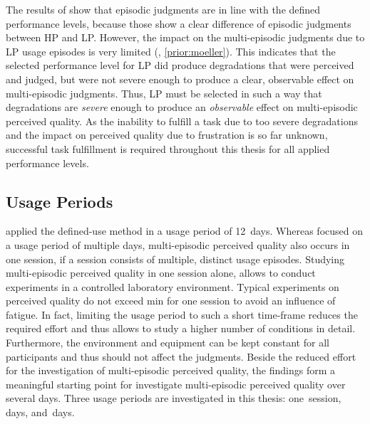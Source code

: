 The results of \citet{moller_single-call_2011} show that episodic judgments are in line with the defined performance levels, because those show a clear difference of episodic judgments between \ac{HP} and \ac{LP}.
However, the impact on the multi-episodic judgments due to \ac{LP} usage episodes is very limited (\cf, \autoref{prior:moeller}).
This indicates that the selected performance level for \ac{LP} did produce degradations that were perceived and judged, but were not severe enough to produce a clear, observable effect on multi-episodic judgments.
Thus, \ac{LP} must be selected in such a way that degradations are \emph{severe} enough to produce an \emph{observable} effect on multi-episodic perceived quality.
As the inability to fulfill a task due to too severe degradations and the impact on perceived quality due to frustration is so far unknown, successful task fulfillment is required throughout this thesis for all applied performance levels.

\subsection{Usage Periods}
\citet{moller_single-call_2011} applied the defined-use method in a usage period of 12~days. 
Whereas \citet{moller_single-call_2011} focused on a usage period of multiple days, multi-episodic perceived quality also occurs in one session, if a session consists of multiple, distinct usage episodes.
Studying multi-episodic perceived quality in one session alone, allows to conduct experiments in a controlled laboratory environment. %
Typical experiments on perceived quality do not exceed \unit[90]{min} for one session to avoid an influence of fatigue.
In fact, limiting the usage period to such a short time-frame reduces the required effort and thus allows to study a higher number of conditions in detail.
Furthermore, the environment and equipment can be kept constant for all participants and thus should not affect the judgments.
Beside the reduced effort for the investigation of multi-episodic perceived quality, the findings form a meaningful starting point for investigate multi-episodic perceived quality over several days.
Three usage periods are investigated in this thesis: one~session, \unit[6]{days}, and~\unit[14]{days}.

